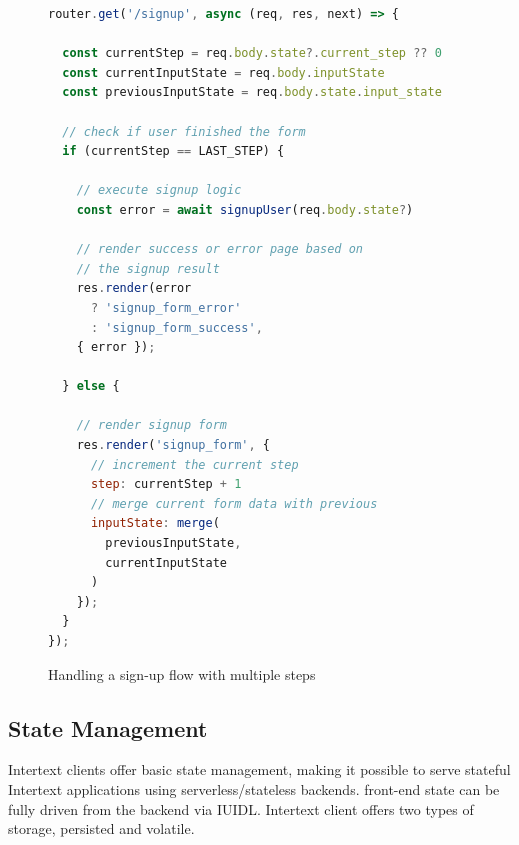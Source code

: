 \begin{figure}
\begin{minipage}{\linewidth}
\begin{lstlisting}[language=javascript]
router.get('/signup', async (req, res, next) => {
  
  const currentStep = req.body.state?.current_step ?? 0
  const currentInputState = req.body.inputState
  const previousInputState = req.body.state.input_state
  
  // check if user finished the form
  if (currentStep == LAST_STEP) {
    
    // execute signup logic
    const error = await signupUser(req.body.state?)
    
    // render success or error page based on
    // the signup result
    res.render(error
      ? 'signup_form_error'
      : 'signup_form_success',
    { error });
  
  } else {
    
    // render signup form
    res.render('signup_form', {
      // increment the current step
      step: currentStep + 1
      // merge current form data with previous
      inputState: merge(
        previousInputState,
        currentInputState
      )
    });
  }
});
\end{lstlisting}
\end{minipage}
\caption{Handling a sign-up flow with multiple steps}%
\label{fig:state_signup_progress_js}%
\end{figure}

\subsection{State Management}

Intertext clients offer basic state management, making it possible to serve stateful Intertext applications using serverless/stateless backends. front-end state can be fully driven from the backend via IUIDL. Intertext client offers two types of storage, persisted and volatile. 


